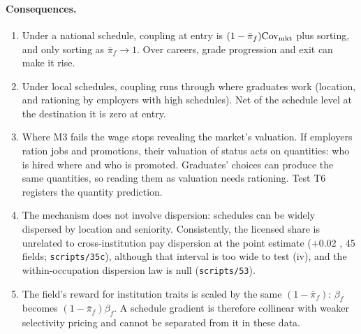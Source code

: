 \paragraph{Consequences.}
\begin{enumerate}
\item[(i)] Under a national schedule, coupling at entry is $(1-\bar\pi_f)\mathrm{Cov}_{\rm mkt}$ plus sorting, and
only sorting as $\bar\pi_f\to1$. Over careers, grade progression and exit can make it rise.
\item[(ii)] Under local schedules, coupling runs through where graduates work (location, and rationing by employers
with high schedules). Net of the schedule level at the destination it is zero at entry.
\item[(iii)] Where M3 fails the wage stops revealing the market's valuation. If employers ration jobs and
promotions, their valuation of status acts on quantities: who is hired where and who is promoted. Graduates'
choices can produce the same quantities, so reading them as valuation needs rationing. Test T6 registers the
quantity prediction.
\item[(iv)] The mechanism does not involve dispersion: schedules can be widely dispersed by location and seniority.
Consistently, the licensed share is unrelated to cross-institution pay dispersion at the point estimate ($+0.02$
, 45 fields; \texttt{scripts/35c}), although that interval is too wide to test (iv), and the
within-occupation dispersion law is null (\texttt{scripts/53}).
\item[(v)] The field's reward for institution traits is scaled by the same $(1-\bar\pi_f)$: $\beta_f$ becomes
$(1-\bar\pi_f)\beta_f$. A schedule gradient is therefore collinear with weaker selectivity pricing and cannot be
separated from it in these data.
\end{enumerate}

